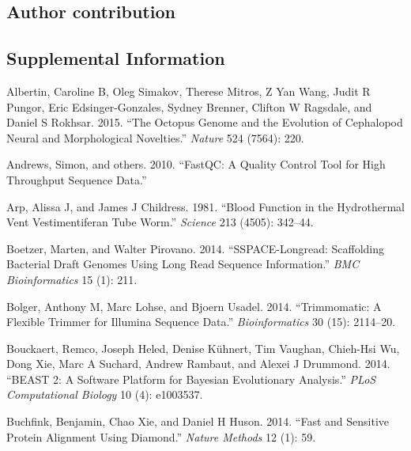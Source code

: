 \documentclass[]{article}
\begin{document}
\hypertarget{author-contribution}{%
\subsection{Author contribution}\label{author-contribution}}

\pagebreak

\hypertarget{supplemental-information}{%
\subsection*{Supplemental Information}\label{supplemental-information}}

\hypertarget{refs}{}
\leavevmode\hypertarget{ref-albertin2015octopus}{}%
Albertin, Caroline B, Oleg Simakov, Therese Mitros, Z Yan Wang, Judit R
Pungor, Eric Edsinger-Gonzales, Sydney Brenner, Clifton W Ragsdale, and
Daniel S Rokhsar. 2015. ``The Octopus Genome and the Evolution of
Cephalopod Neural and Morphological Novelties.'' \emph{Nature} 524
(7564): 220.

\leavevmode\hypertarget{ref-andrews2010fastqc}{}%
Andrews, Simon, and others. 2010. ``FastQC: A Quality Control Tool for
High Throughput Sequence Data.''

\leavevmode\hypertarget{ref-arp1981blood}{}%
Arp, Alissa J, and James J Childress. 1981. ``Blood Function in the
Hydrothermal Vent Vestimentiferan Tube Worm.'' \emph{Science} 213
(4505): 342--44.

\leavevmode\hypertarget{ref-boetzer2014sspace}{}%
Boetzer, Marten, and Walter Pirovano. 2014. ``SSPACE-Longread:
Scaffolding Bacterial Draft Genomes Using Long Read Sequence
Information.'' \emph{BMC Bioinformatics} 15 (1): 211.

\leavevmode\hypertarget{ref-bolger2014trimmomatic}{}%
Bolger, Anthony M, Marc Lohse, and Bjoern Usadel. 2014. ``Trimmomatic: A
Flexible Trimmer for Illumina Sequence Data.'' \emph{Bioinformatics} 30
(15): 2114--20.

\leavevmode\hypertarget{ref-bouckaert2014beast}{}%
Bouckaert, Remco, Joseph Heled, Denise Kühnert, Tim Vaughan, Chieh-Hsi
Wu, Dong Xie, Marc A Suchard, Andrew Rambaut, and Alexei J Drummond.
2014. ``BEAST 2: A Software Platform for Bayesian Evolutionary
Analysis.'' \emph{PLoS Computational Biology} 10 (4): e1003537.

\leavevmode\hypertarget{ref-buchfink2014fast}{}%
Buchfink, Benjamin, Chao Xie, and Daniel H Huson. 2014. ``Fast and
Sensitive Protein Alignment Using Diamond.'' \emph{Nature Methods} 12
(1): 59.
\end{document}
